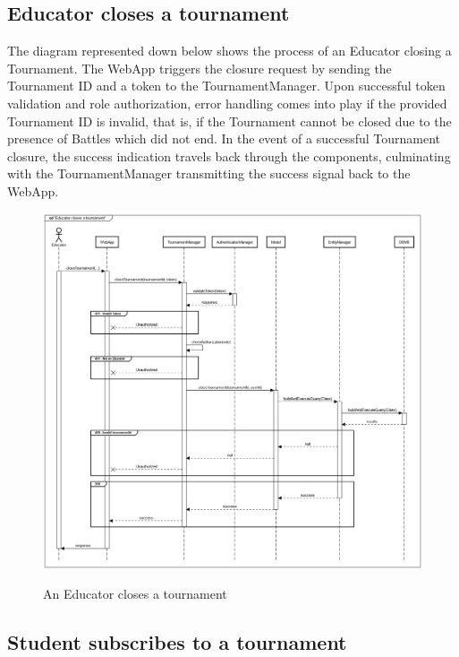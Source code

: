 \documentclass{Configuration_Files/Template}
\begin{document}
\subsection*{Educator closes a tournament }

The diagram represented down below shows the process of an Educator closing a Tournament. The WebApp triggers the closure request by sending the Tournament ID and a token to the TournamentManager. Upon successful token validation and role authorization, error handling comes into play if the provided Tournament ID is invalid, that is, if the Tournament cannot be closed due to the presence of Battles which did not end. In the event of a successful Tournament closure, the success indication travels back through the components, culminating with the TournamentManager transmitting the success signal back to the WebApp. 

\begin{figure}[H]
\centering
\includegraphics[scale = 0.33]{Images/diagrams/sequences/closeTournament.png}\\
\caption{An Educator closes a tournament }
\end{figure}

\subsection*{Student subscribes to a tournament }
\end{document}
